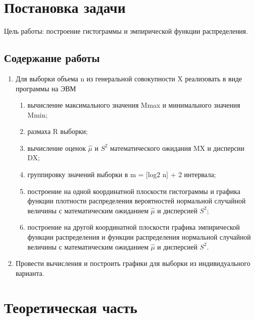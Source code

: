 \documentclass[a4paper, 14pt, unknownkeysallowed]{extreport}
\begin{document}

\setcounter{page}{2}

\chapter{Постановка задачи}
Цель работы: построение гистограммы и эмпирической функции распределения.
\section{Содержание работы}
\begin{enumerate}
	\item Для выборки объема n из генеральной совокупности X реализовать в виде программы на ЭВМ
	\begin{enumerate}
		\item вычисление максимального значения Mmax и минимального значения Mmin;
		\item размаха R выборки;
		\item вычисление оценок $\hat{\mu}$ и $S^2$ математического ожидания MX и дисперсии DX;
		\item группировку значений выборки в m = [log2 n] + 2 интервала;
		\item построение на одной координатной плоскости гистограммы и графика функции плотности распределения вероятностей нормальной случайной величины с математическим
		ожиданием  $\hat{\mu}$ и дисперсией $S^2$;
		\item построение на другой координатной плоскости графика эмпирической функции распределения и функции распределения нормальной случайной величины с математическим
		ожиданием $\hat{\mu}$ и дисперсией $S^2$.
	\end{enumerate}
	\item Провести вычисления и построить графики для выборки из индивидуального варианта.
\end{enumerate}

\chapter{Теоретическая часть}
\end{document}
